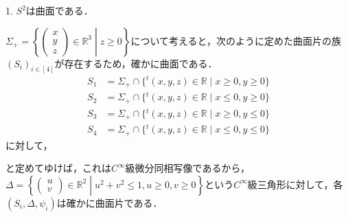 \documentclass[uplatex, dvipdfmx]{jsreport}
\begin{document}
\begin{example}
    1. $S^2$は曲面である．

    $\Sigma_+=\left\{\left(\begin{array}{c}x \\ y \\ z\end{array}\right) \in\mathbb{R}^3\middle| z\ge 0 \right\}$について考えると，次のように定めた曲面片の族$(S_i)_{i\in [4]}$が存在するため，確かに曲面である．
    \begin{align}
        S_1 &= \Sigma_+\cap\{{}^t(x,y,z)\in\mathbb{R}\mid x\ge 0,y\ge 0\}\\
        S_2 &= \Sigma_+\cap\{{}^t(x,y,z)\in\mathbb{R}\mid x\le 0,y\ge 0\}\\
        S_3 &= \Sigma_+\cap\{{}^t(x,y,z)\in\mathbb{R}\mid x\ge 0,y\le 0\}\\
        S_4 &= \Sigma_+\cap\{{}^t(x,y,z)\in\mathbb{R}\mid x\le 0,y\le 0\}
    \end{align}
    に対して，
    \begin{center}
    \end{center}
    と定めてゆけば，これは$C^\infty$級微分同相写像であるから，$\Delta =\left\{ \left(\begin{array}{c}u \\ v\end{array}\right)\in\mathbb{R}^2\middle| u^2+v^2\le 1, u\ge 0,v\ge 0 \right\}$という$C^\infty$級三角形に対して，各$(S_i,\Delta,\psi_i)$は確かに曲面片である．
\end{example}
\end{document}
